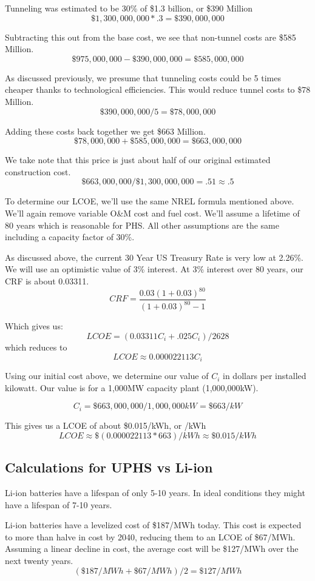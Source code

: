 Tunneling was estimated to be 30\% of \$1.3 billion, or \$390 Million
\[ \$1,300,000,000 * .3 = \$390,000,000\]

Subtracting this out from the base cost, we see that non-tunnel costs are \$585 Million.
\[ \$975,000,000 - \$390,000,000 = \$585,000,000\]

As discussed previously, we presume that tunneling costs could be 5 times cheaper thanks to technological efficiencies. This would reduce tunnel costs to \$78 Million.
\[ \$390,000,000 / 5 = \$78,000,000\]

Adding these costs back together we get \$663 Million.
\[ \$78,000,000 + \$585,000,000 = \$663,000,000 \]

We take note that this price is just about half of our original estimated construction cost.
\[  \$663,000,000  / \$1,300,000,000 = .51 \approx .5 \]

To determine our LCOE, we'll use the same NREL formula mentioned above. We'll again remove variable O\&M cost and fuel cost. We'll assume a lifetime of 80 years which is reasonable for PHS. All other assumptions are the same including a capacity factor of 30\%.

As discussed above, the current 30 Year US Treasury Rate is very low at 2.26\%. We will use an optimistic value of 3\% interest. At 3\% interest over 80 years, our CRF is about 0.03311.
\[ \displaystyle CRF={\frac {0.03(1+0.03)^{80}}{(1+0.03)^{80}-1}} \]

Which gives us:
\[ LCOE = (0.03311C_i + .025C_i) / 2628 \]
which reduces to
\[ LCOE \approx 0.000022113 C_i \]

Using our initial cost above, we determine our value of $C_i$ in dollars per installed kilowatt. Our value is for a 1,000MW capacity plant (1,000,000kW).

\[ C_i = \$663,000,000 / 1,000,000kW = \$663/kW\]

This gives us a LCOE of about \$0.015/kWh, or /kWh
\[ LCOE \approx \$(0.000022113 * 663)/kWh \approx \$0.015/kWh \]

\subsection{Calculations for UPHS vs Li-ion}
Li-ion batteries have a lifespan of only 5-10 years. \cite{The3BillionPlanToTurnHooverDamIntoAGiantBattery} In ideal conditions they might have a lifespan of 7-10 years. \cite{LifePredictionModelForLiIonBattery}

Li-ion batteries have a levelized cost of \$187/MWh today. This cost is expected to more than halve in cost by 2040, reducing them to an LCOE of \$67/MWh. Assuming a linear decline in cost, the average cost will be \$127/MWh over the next twenty years.
\[ (\$187/MWh + \$67/MWh) / 2 =  \$127/MWh \]


